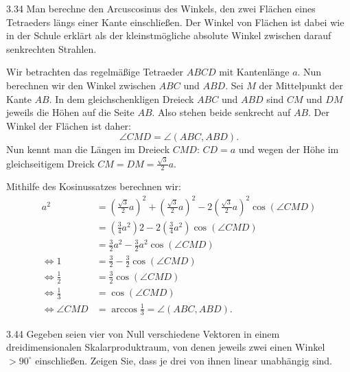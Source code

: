 \begin{exercise}{3.3}{4}
    Man berechne den Arcuscosinus des Winkels, den zwei Flächen eines
    Tetraeders längs einer Kante einschlie\ss en. Der Winkel von Flächen ist dabei wie
    in der Schule erklärt als der kleinstmögliche absolute Winkel zwischen darauf
    senkrechten Strahlen.
\end{exercise}

\begin{minipage}{0.49\linewidth}
    
\end{minipage}
\begin{minipage}{0.5\linewidth}

Wir betrachten das regelmä\ss ige Tetraeder $ABCD$ mit Kantenlänge $a$.
Nun berechnen wir den Winkel zwischen $ABC$ und $ABD$.
Sei $M$ der Mittelpunkt der Kante $AB$.
In dem gleichschenkligen Dreieck $ABC$ und $ABD$ sind $CM$ und $DM$ jeweils die Höhen auf die Seite $AB$.
Also stehen beide senkrecht auf $AB$.
Der Winkel der Flächen ist daher:
\[
    \angle CMD = \angle (ABC, ABD).
\]
Nun kennt man die Längen im Dreieck $CMD$:
$CD = a$ und wegen der Höhe im gleichseitigem Dreick $CM = DM = \frac{\sqrt{3}}{2}a$.


\end{minipage}
Mithilfe des Kosinussatzes berechnen wir:
\begin{align*}
    a^2 &= \left(\frac{\sqrt{3}}{2}a\right)^2 + \left(\frac{\sqrt{3}}{2}a\right)^2 - 2\left(\frac{\sqrt{3}}{2}a\right)^2\cos (\angle CMD) \\
    &= \left(\frac{3}{4}a^2\right)2 - 2\left(\frac{3}{4}a^2\right)\cos (\angle CMD)\\
    &= \frac{3}{2}a^2 - \frac{3}{2}a^2\cos (\angle CMD)\\
    \Longleftrightarrow 1 &= \frac{3}{2} - \frac{3}{2}\cos (\angle CMD)\\
    \Longleftrightarrow \frac{1}{2} &= \frac{3}{2}\cos (\angle CMD)\\
    \Longleftrightarrow \frac{1}{3} &= \cos (\angle CMD)\\
    \Longleftrightarrow \angle CMD &= \boxed{\operatorname{arccos}\frac{1}{3} = \angle (ABC, ABD)}.
\end{align*}

\begin{exercise}{3.4}{4}
    Gegeben seien vier von Null verschiedene Vektoren in einem dreidimensionalen Skalarproduktraum, von denen jeweils zwei einen Winkel $>90^{\circ}$
    einschlie\ss en. Zeigen Sie, dass je drei von ihnen linear unabhängig sind.
\end{exercise}

